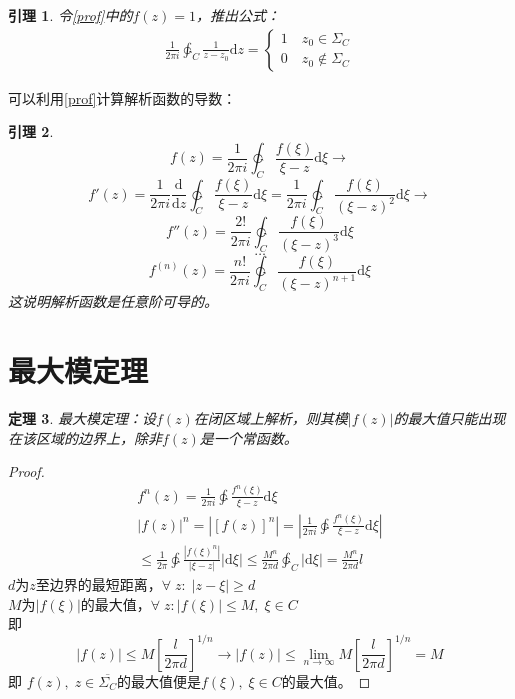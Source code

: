 \documentclass[10pt, a4paper, oneside]{ctexbook}
\newtheorem{theorem}{定理}[section]
\newtheorem{lemma}[theorem]{引理}
\def\D{\mathrm{d}}
\newcommand{\F}[1][z]
{\ensuremath{f(#1)}}
\newcommand{\dev}[3][]
{\ensuremath{\frac{\displaystyle \D^{#1} #2}{ \displaystyle \D #3}}}
\begin{document}
\begin{lemma}
    令\ref{prof}中的$\F=1$，推出公式：
    \begin{align*}
        \frac{1}{2\pi i}\ointctrclockwise_C \frac{1}{z-z_0} \D z=
        \begin{cases}
            1\quad z_0\in \Sigma_C\\
            0\quad z_0\notin \Sigma_C
        \end{cases}
    \end{align*}
\end{lemma}
可以利用\ref{prof}计算解析函数的导数：
\begin{lemma}
    \label{method283}
    $$
    \F = \frac{1}{2\pi i}\ointctrclockwise_C \frac{\F[\xi]}{\xi-z}\D \xi \to
    $$
    $$
    f'(z)=\frac{1}{2\pi i} \dev{}{z}\ointctrclockwise_C \frac{\F[\xi]}{\xi - z}\D \xi= \frac{1}{2\pi i}\ointctrclockwise_C \frac{\F[\xi]}{(\xi-z)^2}\D \xi \to
    $$
    $$
    f''(z)=\frac{2!}{2\pi i}\ointctrclockwise_C \frac{\F[\xi]}{(\xi-z)^3}\D \xi 
    $$
    $$\dots$$
    $$
    f^{(n)}(z)=\frac{n!}{2\pi i}\ointctrclockwise_C \frac{\F[\xi]}{(\xi-z)^{n+1}}\D \xi
    $$
    这说明解析函数是任意阶可导的。
\end{lemma}


\section{最大模定理}
\begin{theorem}
    最大模定理：设$\F$在闭区域上解析，则其模$|\F|$的最大值只能出现在该区域的边界上，除非$\F$是一个常函数。
\end{theorem}
\begin{proof}
    \begin{align*}
        f^n(z)=\frac{1}{2\pi i} \ointctrclockwise \frac{f^n(\xi)}{\xi-z}\D \xi\\
        |\F|^n=|\left[\F\right]^n|=\left|\frac{1}{2\pi i} \ointctrclockwise \frac{f^n(\xi)}{\xi-z}\D \xi\right| \\ \le \frac{1}{2\pi} \ointctrclockwise \frac{|f(\xi)^n|}{|\xi-z|}|\D \xi|
        \le \frac{M^n}{2\pi d}\ointctrclockwise_C |\D \xi|=\frac{M^n}{2\pi d}l
    \end{align*}
    $d$为$z$至边界的最短距离，$\forall\; z:\;|z-\xi|\ge d$\\
    $M$为$|\F[\xi]|$的最大值，$\forall\; z:|f(\xi)|\le M,\;\xi\in C$\\
    即
    $$
    |\F|\le M\left[\frac{l}{2\pi d}\right]^{1/n}\to|\F|\le \lim_{n\to \infty} M\left[\frac{l}{2\pi d}\right]^{1/n}=M
    $$
    即
    $f(z),\;z\in \overline{\Sigma_C}$的最大值便是$f(\xi),\;\xi\in C$的最大值。
\end{proof}
\end{document}
